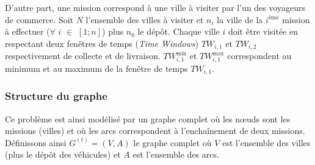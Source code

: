 D'autre part, une mission correspond à une ville à visiter par l'un des voyageurs de commerce. Soit $N$ l'ensemble des villes à visiter et $n_i$ la ville de la $i^{\text{ème}}$ mission à effectuer ($\forall$ $i$ $\in$ $[1;n]$) plus $n_0$ le dépôt. Chaque ville $i$ doit être visitée en respectant deux fenêtres de temps (\textit{Time Windows}) $TW_{i,1}$ et $TW_{i,2}$ respectivement de collecte et de livraison. $TW_{i,1}^{\min}$ et $TW_{i,1}^{\max}$ correspondent au minimum et au maximum de la fenêtre de temps $TW_{i,1}$.

\subsubsection{Structure du graphe}
Ce problème est ainsi modélisé par un graphe complet où les n\oe{}uds sont les missions (villes) et où les arcs correspondent à l'enchaînement de deux missions. 
Définissons ainsi $G^{(t)}=(V,A)$ le graphe complet où $V$ est l'ensemble des villes (plus le dépôt des véhicules) et $A$ est l'ensemble des arcs.


